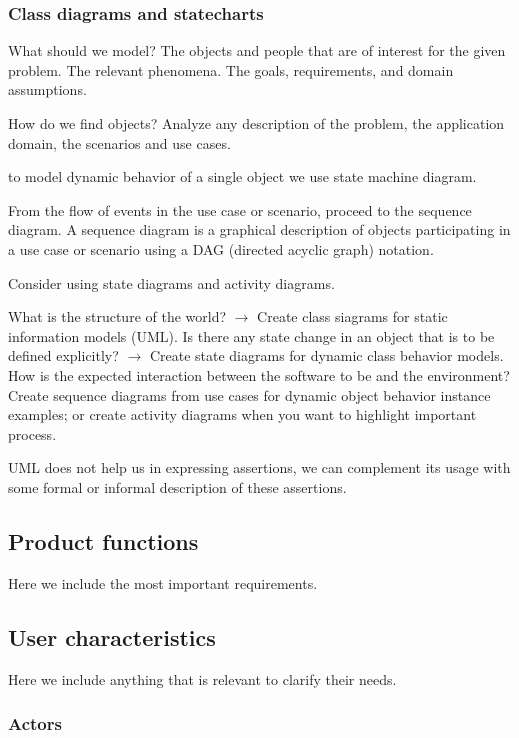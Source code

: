 \subsubsection{Class diagrams and statecharts}
\label{subsubsect:domainmodel}

What should we model? The objects and people that are of interest for the given problem. The relevant phenomena. The goals, requirements, and domain assumptions.

How do we find objects? Analyze any description of the problem, the application domain, the scenarios and use cases. 

to model dynamic behavior of a single object we use state machine diagram.

From the flow of events in the use case or scenario, proceed to the sequence diagram. A sequence diagram is a graphical description of objects participating in a use case or scenario using a DAG (directed acyclic graph) notation.

Consider using state diagrams and activity diagrams.

What is the structure of the world? $\rightarrow$ Create class siagrams for static information models (UML). Is there any state change in an object that is to be defined explicitly? $\rightarrow$ Create state diagrams for dynamic class behavior models. How is the expected interaction between the software to be and the environment? Create sequence diagrams from use cases for dynamic object behavior instance examples; or create activity diagrams when you want to highlight important process.

UML does not help us in expressing assertions, we can complement its usage with some formal or informal description of these assertions.

\subsection{Product functions}
\label{subsect:productfunctions}

Here we include the most important requirements.

\subsection{User characteristics}
\label{subsect:usercharacteristics}

Here we include anything that is relevant to clarify their needs.

\subsubsection{Actors}
\label{subsubsect:actors}

